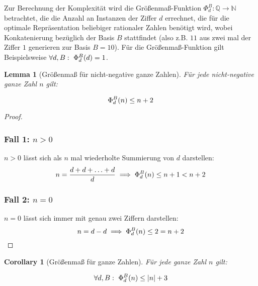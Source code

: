 \documentclass{article}
\newtheorem{corollary}{Corollary}[theorem]
\newtheorem{lemma}[theorem]{Lemma}
\theoremstyle{nonumberplain}
\newtheorem{proof}{Beweis}
\begin{document}
Zur Berechnung der Komplexität wird die Größenmaß-Funktion \(\Phi_{d}^{B} : \mathbb{Q} \to \mathbb{N}\) betrachtet, die die Anzahl an Instanzen der Ziffer \(d\) errechnet, die für die optimale Repräsentation beliebiger rationaler Zahlen benötigt wird, wobei Konkatenierung bezüglich der Basis \(B\) stattfindet (also z.B. \(11\) aus zwei mal der Ziffer \(1\) generieren zur Basis \(B=10\)). Für die Größenmaß-Funktion gilt Beispielsweise \(\forall d, B:\ \Phi_{d}^{B}(d) = 1\).


\begin{lemma}[Größenmaß für nicht-negative ganze Zahlen]\label{lemma:measure_linear_nonnegative}
    Für jede nicht-negative ganze Zahl \(n\) gilt:

    \[\Phi_{d}^{B}(n) \leq n + 2\]
\end{lemma}
\begin{proof}
    \subsubsection*{Fall 1: \(n > 0\)}
    
    \(n > 0\) lässt sich als \(n\) mal wiederholte Summierung von \(d\) darstellen:
    \[n = \frac{d+d+\ldots+d}{d} \implies \Phi_{d}^{B}(n) \leq n + 1 < n + 2\]

    \subsubsection*{Fall 2: \(n = 0\)}
        
    \(n = 0\) lässt sich immer mit genau zwei Ziffern darstellen:
    \[n = d - d \implies \Phi_{d}^{B}(n) \leq 2 = n + 2\]
\end{proof}
\begin{corollary}[Größenmaß für ganze Zahlen]\label{lemma:measure_linear}
    Für jede ganze Zahl \(n\) gilt:

    \[\forall d, B:\  \Phi_{d}^{B}(n) \leq |n| + 3\]
\end{corollary}
\end{document}
